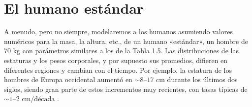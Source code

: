 \documentclass[12pt]{book}
\begin{document}
\section{El humano estándar}

A menudo, pero no siempre, modelaremos a los humanos asumiendo valores numéricos para la masa, la altura, etc., de un humano «estándar», un hombre de 70 kg con parámetros similares a los de la Tabla 1.5. Las distribuciones de las estaturas y los pesos corporales, y por supuesto sus promedios, difieren en diferentes regiones y cambian con el tiempo. Por ejemplo, la estatura de los hombres de Europa occidental aumentó en $\sim 8\text{--}17\text{ cm}$ durante los últimos dos siglos, siendo gran parte de estos incrementos muy recientes, con tasas típicas de $\sim 1\text{--}2\text{ cm/década}$ \cite{13}.
\end{document}
